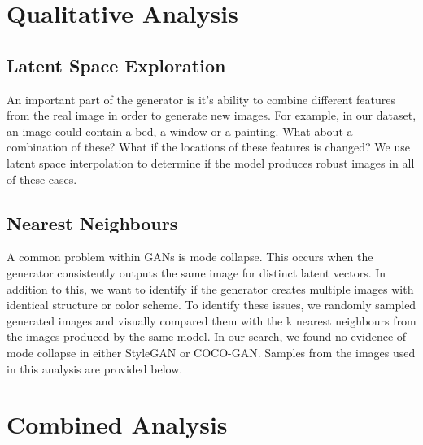 \documentclass[12pt]{article}
\begin{document}
\begin{multicols*}{2}
        \section{Qualitative Analysis}
        \label{sec:qualitative}
        \subsection{Latent Space Exploration}
        \label{subsec:latentSpaceExploration}
        An important part of the generator is it's ability to combine different features from the real image in order to generate new images.
        For example, in our dataset, an image could contain a bed, a window or a painting. What about a combination of these?
        What if the locations of these features is changed? We use latent space interpolation to determine if the model produces robust images in all of these cases.

        \subsection{Nearest Neighbours}
        \label{subsec:nearestneighbours}
        A common problem within GANs is mode collapse.
        This occurs when the generator consistently outputs the same image for distinct latent vectors.
        In addition to this, we want to identify if the generator creates multiple images with identical structure or color scheme.
        To identify these issues, we randomly sampled generated images and visually compared them with the k nearest neighbours from the images produced by the same model.
        In our search, we found no evidence of mode collapse in either StyleGAN or COCO-GAN. Samples from the images used in this analysis are provided below.

        \section{Combined Analysis}
        \label{sec:combinedAnalysis}

\end{multicols*}
\end{document}
